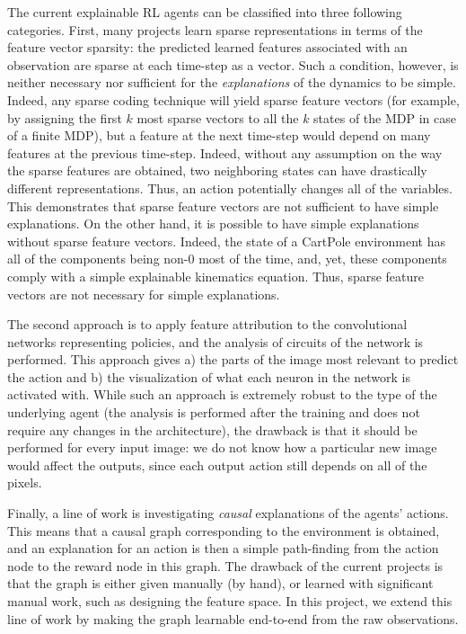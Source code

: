 \documentclass[a4paper,11pt,oneside]{report}
\begin{document}
The current explainable RL agents can be classified into three following categories. First, many projects learn sparse representations in terms of the feature vector sparsity: the predicted learned features associated with an observation are sparse at each time-step as a vector. Such a condition, however, is neither necessary nor sufficient for the {\em explanations} of the dynamics to be simple. Indeed, any sparse coding technique will yield sparse feature vectors (for example, by assigning the first $k$ most sparse vectors to all the $k$ states of the MDP in case of a finite MDP), but a feature at the next time-step would depend on many features at the previous time-step. Indeed, without any assumption on the way the sparse features are obtained, two neighboring states can have drastically different representations. Thus, an action potentially changes all of the variables. This demonstrates that sparse feature vectors are not sufficient to have simple explanations. On the other hand, it is possible to have simple explanations without sparse feature vectors. Indeed, the state of a CartPole environment has all of the components being non-0 most of the time, and, yet, these components comply with a simple explainable kinematics equation. Thus, sparse feature vectors are not necessary for simple explanations.

The second approach is to apply feature attribution to the convolutional networks representing policies, and the analysis of circuits of the network is performed. This approach gives a) the parts of the image most relevant to predict the action and b) the visualization of what each neuron in the network is activated with. While such an approach is extremely robust to the type of the underlying agent (the analysis is performed after the training and does not require any changes in the architecture), the drawback is that it should be performed for every input image: we do not know how a particular new image would affect the outputs, since each output action still depends on all of the pixels.

Finally, a line of work is investigating {\em causal} explanations of the agents' actions. This means that a causal graph corresponding to the environment is obtained, and an explanation for an action is then a simple path-finding from the action node to the reward node in this graph. The drawback of the current projects is that the graph is either given manually (by hand), or learned with significant manual work, such as designing the feature space. In this project, we extend this line of work by making the graph learnable end-to-end from the raw observations.
\end{document}
